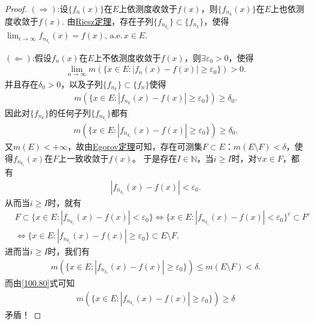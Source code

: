 \documentclass[../../main.tex]{subfiles}%
\begin{document}
\begin{proof}

\((\Rightarrow)\):设$\{f_n(x)\}$在$E$上依测度收敛于$f(x)$，则$\{f_{n_k}(x)\}$在$E$上也依测度收敛于$f(x)$. 由\hyperref[theorem:Riesz定理]{Riesz定理}，存在子列\(\{f_{n_{k_i}}\} \subset \{f_{n_k}\}\)，使得$\lim_{i\to \infty}f_{n_{k_i}}(x)= f(x),\,\text{a.e.}\,x\in E.$

\((\Leftarrow)\):假设\(f_n(x)\)在\(E\)上不依测度收敛于\(f(x)\)，则\(\exists \varepsilon_0 > 0\)，使得
\begin{align*}
\underset{n\rightarrow \infty}{\lim}m(\{x\in E:|f_n(x)-f(x)|\geqslant \varepsilon _0\})>0.
\end{align*}
并且存在\(\delta_0 > 0\)，以及子列\(\{f_{n_k}\} \subset \{f_n\}\)使得
\begin{align*}
m(\{x \in E : |f_{n_k}(x) - f(x)| \geqslant \varepsilon_0\}) \geqslant \delta_0.
\end{align*}
因此对\(\{f_{n_k}\}\)的任何子列$\{f_{n_{k_i}}\}$都有
\begin{align}
m(\{x \in E : |f_{n_{k_i}}(x) - f(x)| \geqslant \varepsilon_0\}) \geqslant \delta_0.\label{100.80}
\end{align}
又\(m(E) < +\infty\)，故由\hyperref[theorem:Egorov定理]{Egorov定理}可知，存在可测集\(F \subset E\)：\(m(E \setminus F) < \delta\)，使得\(f_{n_{k_i}}(x)\)在\(F\)上一致收敛于\(f(x)\)。
于是存在\(I \in \mathbb{N}\)，当\(i \geqslant I\)时，对\(\forall x \in F\)，都有
\begin{align*}
|f_{n_{k_i}}(x) - f(x)| < \varepsilon_0.
\end{align*}
从而当\(i \geqslant I\)时，就有
\begin{align*}
&F \subset \{x \in E : |f_{n_{k_i}}(x) - f(x)| < \varepsilon_0\} \Longleftrightarrow \{x \in E : |f_{n_{k_i}}(x) - f(x)| < \varepsilon_0\}^c \subset F^c \\
&\Longleftrightarrow \{x \in E : |f_{n_{k_i}}(x) - f(x)| \geqslant \varepsilon_0\} \subset E \setminus F.
\end{align*}
进而当\(i \geqslant I\)时，我们有
\begin{align*}
m(\{x \in E : |f_{n_{k_i}}(x) - f(x)| \geqslant \varepsilon_0\}) \leqslant m(E \setminus F) < \delta.
\end{align*}
而由\eqref{100.80}式可知
\begin{align*}
m(\{x \in E : |f_{n_{k_i}}(x) - f(x)| \geqslant \varepsilon_0\}) \geqslant \delta
\end{align*}
矛盾！

\end{proof}
\end{document}
